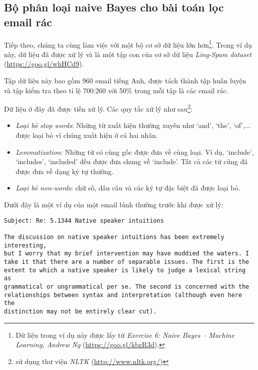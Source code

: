 \subsection{Bộ phân loại naive Bayes cho bài toán lọc email rác}
Tiếp theo, chúng ta cùng làm việc với một bộ cơ sở dữ liệu lớn hơn\footnote{Dữ liệu trong ví dụ này được lấy từ \textit{Exercise 6: Naive Bayes -- Machine Learning, Andrew Ng} (\url{https://goo.gl/kbzR3d}).}. Trong ví dụ này, dữ liệu đã được xử lý và là một tập con của cơ sở dữ liệu \textit{Ling-Spam dataset} (\url{https://goo.gl/whHCd9}).



Tập dữ liệu này bao gồm 960 email tiếng Anh, được tách thành tập huấn luyện và tập kiểm tra theo tỉ lệ 700:260 với 50\% trong mỗi tập là các email rác.

Dữ liệu ở đây đã được tiền xử lý. Các quy tắc xử lý như sau\footnote{sử dụng thư viện \textit{NLTK}
(\url{http://www.nltk.org/})}:
\begin{itemize}
\item \textit{Loại bỏ \textit{stop words}}: Những từ xuất hiện thường xuyên như `and', `the', `of',... được loại bỏ vì chúng xuất hiện ở cả hai nhãn.

\item \textit{Lemmatization}: Những từ có cùng gốc được đưa về cùng loại. Ví dụ, `include', `includes', `included' đều được đưa chung về `include'. Tất cả các từ cũng đã được đưa về dạng ký tự thường.


\item \textit{Loại bỏ \textit{non-words}}: chữ số, dấu câu và các ký tự đặc biệt đã được loại bỏ.
\end{itemize}



Dưới đây là một ví dụ của một email bình thường {trước khi được xử lý}:

\begin{lstlisting}
Subject: Re: 5.1344 Native speaker intuitions

The discussion on native speaker intuitions has been extremely interesting,
but I worry that my brief intervention may have muddied the waters. I
take it that there are a number of separable issues. The first is the
extent to which a native speaker is likely to judge a lexical string as
grammatical or ungrammatical per se. The second is concerned with the
relationships between syntax and interpretation (although even here the
distinction may not be entirely clear cut). \end{lstlisting}

